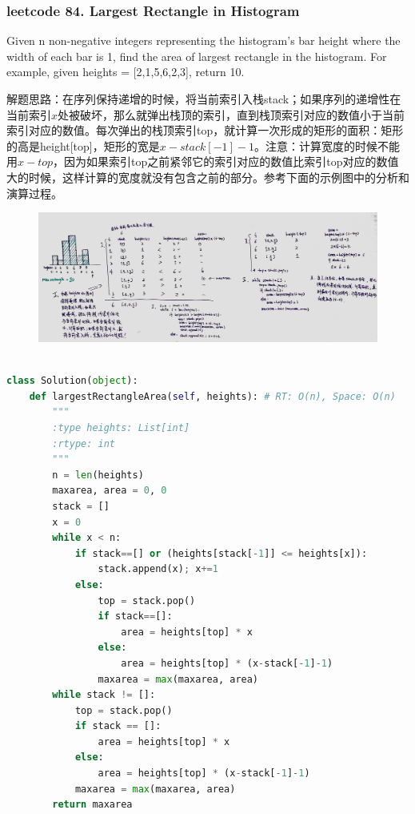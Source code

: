 \documentclass[a4paper,10pt]{article}
\begin{document}
\subsubsection{leetcode 84. Largest Rectangle in Histogram}
Given n non-negative integers representing the histogram's bar height where the width of each bar is 1, find the area of largest rectangle in the histogram. For example, given heights = [2,1,5,6,2,3], return 10. \\

\begin{CJK*}{UTF8}{gbsn}
\noindent 解题思路：在序列保持递增的时候，将当前索引入栈stack；如果序列的递增性在当前索引$x$处被破坏，那么就弹出栈顶的索引，直到栈顶索引对应的数值小于当前索引对应的数值。每次弹出的栈顶索引top，就计算一次形成的矩形的面积：矩形的高是height[top]，矩形的宽是$x-stack[-1]-1$。注意：计算宽度的时候不能用$x-top$，因为如果索引top之前紧邻它的索引对应的数值比索引top对应的数值大的时候，这样计算的宽度就没有包含之前的部分。参考下面的示例图中的分析和演算过程。
\end{CJK*}

\begin{figure}[h]
    \includegraphics[width=\textwidth]{leetcode84.jpg}
    \centering \\
\end{figure}

\begin{lstlisting}[language=Python, caption=Problem84. Largest Rectangle in Histogram]

class Solution(object):
    def largestRectangleArea(self, heights): # RT: O(n), Space: O(n)
        """
        :type heights: List[int]
        :rtype: int
        """
        n = len(heights)
        maxarea, area = 0, 0
        stack = []
        x = 0
        while x < n:
            if stack==[] or (heights[stack[-1]] <= heights[x]):
                stack.append(x); x+=1
            else:
                top = stack.pop()
                if stack==[]:
                    area = heights[top] * x
                else:
                    area = heights[top] * (x-stack[-1]-1)
                maxarea = max(maxarea, area)
        while stack != []:
            top = stack.pop()
            if stack == []:
                area = heights[top] * x
            else:
                area = heights[top] * (x-stack[-1]-1)
            maxarea = max(maxarea, area)
        return maxarea
\end{lstlisting}
\end{document}
